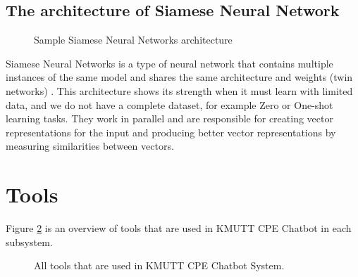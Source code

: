 \documentclass[12pt,oneside,openright,a4paper]{cpe-english-project}
\begin{document}
\subsection{The architecture of Siamese Neural Network}
\begin{figure}[!h]
  \centering
  \setlength{\fboxrule}{0.2mm}
  \setlength{\fboxsep}{0.5cm}
  \caption{Sample Siamese Neural Networks architecture}
  \label{fig:siamese_arch}
\end{figure}
Siamese Neural Networks is a type of neural network that contains multiple instances of the
same model and shares the same architecture and weights (twin networks) \cite{what_is_embedding_matrix, how_to_predict_questions_pair_using_malstm, introduction_siamese_network}
. This architecture shows its strength when it must learn with limited data, and we do not have a complete dataset,
for example Zero or One-shot learning tasks. They work in parallel and are responsible for creating vector
representations for the input and producing better vector representations by measuring similarities between vectors. 

\section{Tools}
Figure \ref*{fig:ch3_tools} is an overview of tools that are used in KMUTT CPE Chatbot in each subsystem.
\begin{figure}[h!]
  \centering
  \setlength{\fboxrule}{0.2mm}
  \setlength{\fboxsep}{0.5cm}
  \caption{All tools that are used in KMUTT CPE Chatbot System.}
  \label{fig:ch3_tools}
\end{figure}
\end{document}
